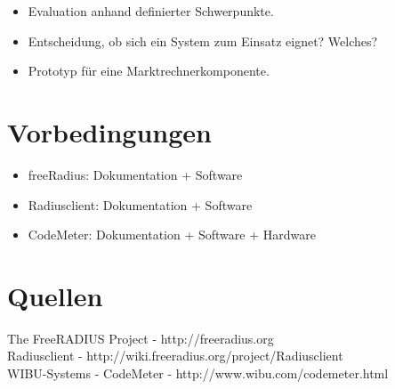 \documentclass{article}
\begin{document}
\begin{itemize}
\item Evaluation anhand definierter Schwerpunkte.
\item Entscheidung, ob sich ein System zum Einsatz eignet? Welches?
\item Prototyp für eine Marktrechnerkomponente.
\end{itemize}

\section{Vorbedingungen}

\begin{itemize}
\item freeRadius: Dokumentation + Software 
\item Radiusclient: Dokumentation + Software
\item CodeMeter: Dokumentation + Software + Hardware
\end{itemize}

\section{Quellen}

The FreeRADIUS Project - http://freeradius.org\\
Radiusclient - http://wiki.freeradius.org/project/Radiusclient\\
WIBU-Systems - CodeMeter - http://www.wibu.com/codemeter.html
\end{document}
